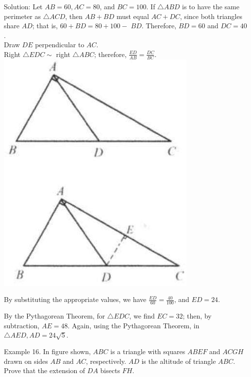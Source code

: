 \documentclass[10pt]{article}
\begin{document}
Solution:
Let \(A B=60, A C=80\), and \(B C=100\). If \(\triangle A B D\) is to have the same perimeter as \(\triangle A C D\), then \(A B+B D\) must equal \(A C+D C\), since both triangles share \(A D\); that is, \(60+B D=80+100-\) \(B D\). Therefore, \(B D=60\) and \(D C=40\).\\
Draw \(D E\) perpendicular to \(A C\).\\
Right \(\triangle E D C \sim\) right \(\triangle A B C\); therefore, \(\frac{E D}{A B}=\frac{D C}{B C}\).\\
\includegraphics[max width=\textwidth, center]{2025_04_17_97bc1f7e44d93c271a88g-083(2)}


By substituting the appropriate values, we have \(\frac{E D}{60}=\frac{40}{100}\), and \(E D=24\).

By the Pythagorean Theorem, for \(\triangle E D C\), we find \(E C=32\); then, by subtraction, \(A E=48\). Again, using the Pythagorean Theorem, in \(\triangle A E D, A D=24 \sqrt{5}\).

Example 16. In figure shown, \(A B C\) is a triangle with squares \(A B E F\) and \(A C G H\) drawn on sides \(A B\) and \(A C\), respectively. \(A D\) is the altitude of triangle \(A B C\). Prove that the extension of \(D A\) bisects \(F H\).
\end{document}
